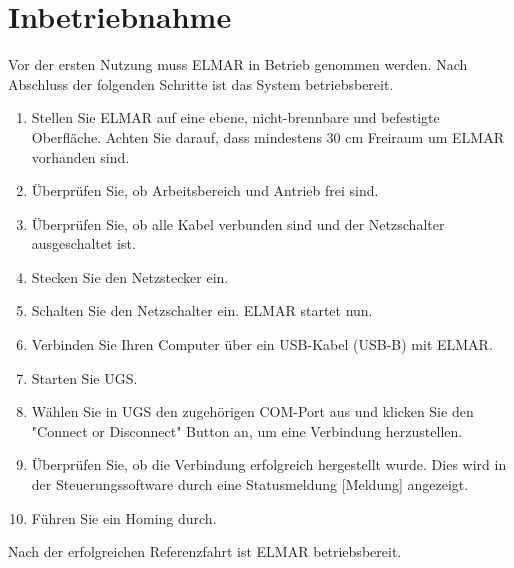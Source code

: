 %
%

\chapter{Inbetriebnahme}

Vor der ersten Nutzung muss ELMAR in Betrieb genommen werden. Nach Abschluss der folgenden Schritte ist das System betriebsbereit.

\begin{enumerate}
	
	\item Stellen Sie ELMAR auf eine ebene, nicht-brennbare und befestigte Oberfläche. 
	Achten Sie darauf, dass mindestens 30 cm Freiraum um ELMAR vorhanden sind.
	
	\item Überprüfen Sie, ob Arbeitsbereich und Antrieb frei sind.
	
	\item Überprüfen Sie, ob alle Kabel verbunden sind und der Netzschalter ausgeschaltet ist.
	
	\item Stecken Sie den Netzstecker ein.
	
	\item Schalten Sie den Netzschalter ein. ELMAR startet nun.
	
	\item Verbinden Sie Ihren Computer über ein USB-Kabel (USB-B) mit ELMAR.
	
	\item Starten Sie UGS.
	
	\item Wählen Sie in UGS den zugehörigen COM-Port aus und klicken Sie den "Connect or Disconnect" Button an, um eine Verbindung herzustellen.
	
	\item Überprüfen Sie, ob die Verbindung erfolgreich hergestellt wurde. Dies wird in der Steuerungssoftware durch eine Statusmeldung [Meldung] angezeigt.
	
	\item Führen Sie ein Homing durch.  
	
\end{enumerate}

Nach der erfolgreichen Referenzfahrt ist ELMAR betriebsbereit.